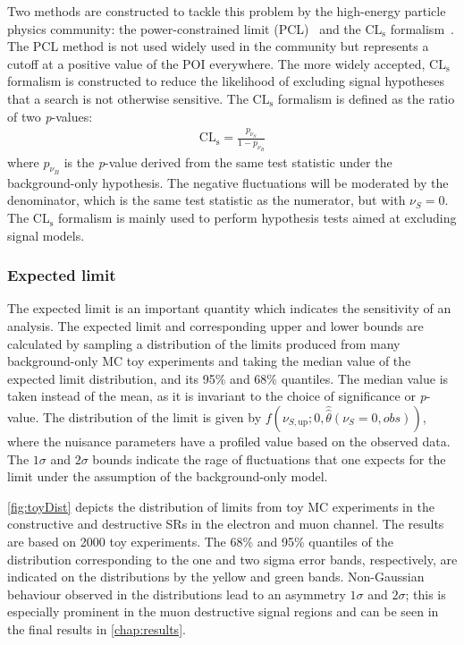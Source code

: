Two methods are constructed to tackle this problem by the high-energy particle physics community: the power-constrained limit (PCL)~\cite{PhysRevLett.122.231801} and the $\mathrm{CL}_\mathrm{s}$ formalism~\cite{JUNK1999435,Read_2002}. The PCL method is not used widely used in the community but represents a cutoff at a positive value of the POI everywhere. The more widely accepted, $\mathrm{CL}_\mathrm{s}$ formalism is constructed to reduce the likelihood of excluding signal hypotheses that a search is not otherwise sensitive. The $\mathrm{CL}_\mathrm{s}$ formalism is defined as the ratio of two \emph{p}-values:
\begin{equation}
    \label{eq:cls}
    \begin{aligned}
        \mathrm{CL}_\mathrm{s} = \frac{p_{\nu_{S}}}{1-p_{\nu_{B}}}
    \end{aligned}
\end{equation}
where $p_{\nu_{B}}$ is the \emph{p}-value derived from the same test statistic under the background-only hypothesis. The negative fluctuations will be moderated by the denominator, which is the same test statistic as the numerator, but with $\nu_S = 0$. The $\mathrm{CL}_\mathrm{s}$ formalism is mainly used to perform hypothesis tests aimed at excluding signal models. 

\subsubsection{Expected limit}
The expected limit is an important quantity which indicates the sensitivity of an analysis. The expected limit and corresponding upper and lower bounds are calculated by sampling a distribution of the limits produced from many background-only MC toy experiments and taking the median value of the expected limit distribution, and its 95\% and 68\% quantiles. The median value is taken instead of the mean, as it is invariant to the choice of significance or \emph{p}-value. The distribution of the limit is given by $f(\nu_{S,\mathrm{up}};0,\hat{\hat{\theta}}(\nu_S = 0,obs))$, where the nuisance parameters have a profiled value based on the observed data. The $1\sigma$ and $2\sigma$ bounds indicate the rage of fluctuations that one expects for the limit under the assumption of the background-only model. 

\cref{fig:toyDist} depicts the distribution of limits from toy MC experiments in the constructive and destructive SRs in the electron and muon channel. The results are based on 2000 toy experiments. The 68\% and 95\% quantiles of the distribution corresponding to the one and two sigma error bands, respectively, are indicated on the distributions by the yellow and green bands. Non-Gaussian behaviour observed in the distributions lead to an asymmetry $1\sigma$ and $2\sigma$; this is especially prominent in the muon destructive signal regions and can be seen in the final 
results in \cref{chap:results}. 


